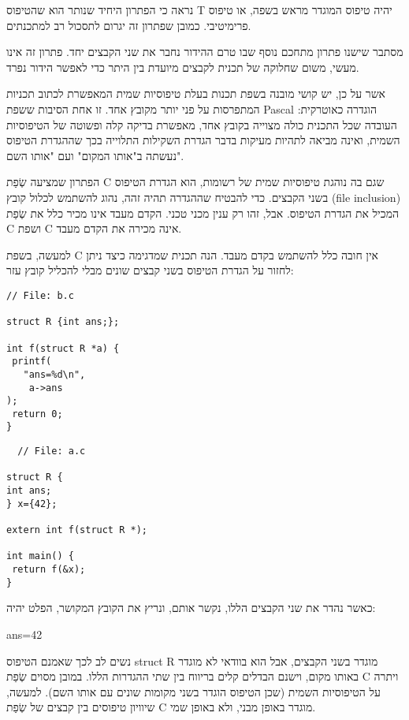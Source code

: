       נראה כי הפתרון היחיד שנותר הוא שהטיפוס T יהיה טיפוס המוגדר מראש בשפה, או טיפוס פרימיטיבי. כמובן שפתרון זה יגרום לתסכול רב למתכנתים.

      מסתבר שישנו פתרון מתחכם נוסף שבו טרם ההידור נחבר את שני הקבצים יחד. פתרון זה אינו מעשי, משום שחלוקה של תכנית לקבצים מיועדת בין היתר כדי לאפשר הידור נפרד.

      אשר על כן, יש קושי מובנה בשפת תכנות בעלת טיפוסיות שמית המאפשרת לכתוב תכניות
      המתפרסות על פני יותר מקובץ אחד. זו אחת הסיבות ששפת Pascal הוגדרה כאוטרקית:
      העובדה שכל התכנית כולה מצוייה בקובץ אחד, מאפשרת בדיקה קלה ופשוטה של הטיפוסיות
      השמית, ואינה מביאה לתהיות מעיקות בדבר הגדרת השקילות התלוייה בכך שההגדרת הטיפוס
      נעשתה ב"אותו המקום" ועם "אותו השם".

      הפתרון שמציעה שְׂפַת C שגם בה נוהגת טיפוסיות שמית של רשומות, הוא הגדרת הטיפוס בשני
      הקבצים. כדי להבטיח שההגדרה תהיה זהה, נהוג להשתמש לכלול קובץ (file inclusion)
      המכיל את הגדרת הטיפוס. אבל, זהו רק ענין מכני טכני. הקדם מעבד אינו מכיר כלל את
      שְׂפַת C ושפת C אינה מכירה את הקדם מעבד.

      למעשה, בשפת C אין חובה כלל להשתמש בקדם מעבד. הנה תכנית שמדגימה כיצד ניתן לחזור
      על הגדרת הטיפוס בשני קבצים שונים מבלי להכליל קובץ עזר:

\begin{verbatim}
// File: b.c

struct R {int ans;};

int f(struct R *a) {
 printf(
   "ans=%d\n",
    a->ans
);
 return 0;
}

\end{verbatim}

\begin{verbatim}
  // File: a.c

struct R {
int ans;
} x={42};

extern int f(struct R *);

int main() {
 return f(&x);
}
\end{verbatim}

      כאשר נהדר את שני הקבצים הללו, נקשר אותם, ונריץ את הקובץ המקושר, הפלט יהיה:

      ans=42

      נשים לב לכך שאמנם הטיפוס struct R מוגדר בשני הקבצים, אבל הוא בוודאי לא מוגדר באותו מקום, וישנם הבדלים קלים בריווח בין שתי ההגדרות הללו. במובן מסוים שְׂפַת C ויתרה על הטיפוסיות השמית (שכן הטיפוס הוגדר בשני מקומות שונים עם אותו השם). למעשה, שיוויון טיפוסים בין קבצים של שְׂפַת C מוגדר באופן מבני, ולא באופן שמי.

